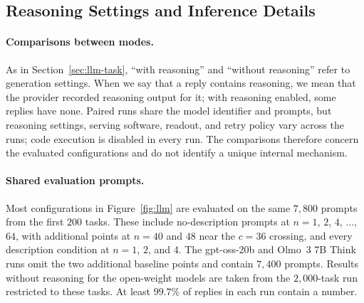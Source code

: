 \begin{table}[htbp]
\centering\footnotesize
\caption[Description weights under four wordings without reasoning]{\textbf{Description weights under four wordings without reasoning.} Weights are reported for the three relevant descriptions at $n = 1$ and $4$, using written readouts on the tasks of the $2{,}000$-task run. ``Number'' denotes the numeric response rate averaged over demonstration counts; a weight is italicized when the response rate at that count is below three quarters. The reference weights are $0.50$, $0.80$, and $0.97$ at $n = 1$, and $0.20$, $0.50$, and $0.90$ at $n = 4$. Wording changes overall reliance on the description, but the observed change with stated precision remains smaller than the reference change.}
\label{tab:paraphrase}
\vspace{3pt}
\end{table}

\subsection{Reasoning Settings and Inference Details}\label{sec:llm-runs}

\paragraph{Comparisons between modes.}
As in Section~\ref{sec:llm-task}, ``with reasoning'' and ``without reasoning'' refer to generation settings. When we say that a reply contains reasoning, we mean that the provider recorded reasoning output for it; with reasoning enabled, some replies have none. Paired runs share the model identifier and prompts, but reasoning settings, serving software, readout, and retry policy vary across the runs; code execution is disabled in every run. The comparisons therefore concern the evaluated configurations and do not identify a unique internal mechanism.

\paragraph{Shared evaluation prompts.}
Most configurations in Figure~\ref{fig:llm} are evaluated on the same $7{,}800$ prompts from the first $200$ tasks. These include no-description prompts at $n=1$, $2$, $4$, $\ldots$, $64$, with additional points at $n=40$ and $48$ near the $c=36$ crossing, and every description condition at $n=1$, $2$, and $4$. The gpt-oss-20b and Olmo~3 7B Think runs omit the two additional baseline points and contain $7{,}400$ prompts. Results without reasoning for the open-weight models are taken from the $2{,}000$-task run restricted to these tasks. At least $99.7\%$ of replies in each run contain a number.

